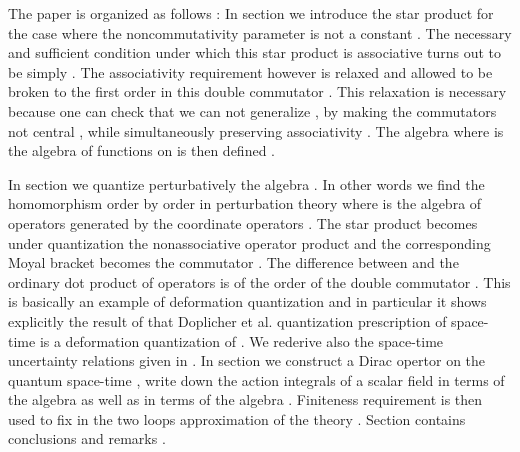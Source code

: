\documentclass[a4paper,12pt]{article}
\begin{document}
The paper is organized as follows : In section \coordHE{} we introduce
the star product \cite{kon} for the case where the
noncommutativity parameter \myHighlight{${\theta}$}\coordHE{} is not a constant . The
necessary and sufficient condition under which this star product
is associative turns out to be  simply
\coordHE{} . The associativity
requirement however is relaxed and allowed to be broken to the
first order in this double commutator . This relaxation is
necessary because one can check that we can not generalize
\cite{dop} , by making the commutators \myHighlight{$[X^{\mu},X^{\nu}]$}\coordHE{} not
central , while simultaneously preserving associativity . The
algebra \coordHE{} where \coordHE{} is the algebra of
functions on \coordHE{} is then defined .

 In section \coordHE{} we quantize
perturbatively the algebra \coordHE{} . In other words we
find the homomorphism \coordHE{} order by order in perturbation
theory where \coordHE{} is the algebra of operators generated by the
coordinate operators \coordHE{} . The star product becomes under
quantization the nonassociative operator product \myHighlight{${\times}$}\coordHE{} and
the corresponding Moyal bracket becomes the commutator
\myHighlight{$[.,.]_{\times}$}\coordHE{}\cite{merkulov} . The difference between
\myHighlight{${\times}$}\coordHE{} and the ordinary dot product of operators is of the
order of the  double commutator\myHighlight{$[X^{\mu},[X^{\nu},X^{\alpha}]]$}\coordHE{} .
This is basically an example of deformation quantization
\cite{kon,merkulov,rieffel,gracia} and in particular it shows
explicitly the result of \cite{rieffel} that Doplicher et
al.\cite{dop} quantization prescription of space-time is a
deformation quantization of \coordHE{}  . We rederive also the
space-time uncertainty relations given in \cite{dop}  . In
section \coordHE{} we construct a Dirac opertor on the quantum
space-time \coordHE{} , write down the action integrals of a scalar
field in terms of the algebra \coordHE{} as well as in terms
of the algebra \coordHE{} . Finiteness requirement is then
used to fix \myHighlight{${\theta}$}\coordHE{} in the two loops approximation of the
\coordHE{} theory  . Section \coordHE{} contains conclusions and remarks
.
\end{document}
